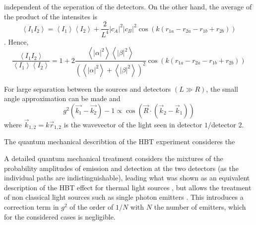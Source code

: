 independent of the seperation of the detectors. On the other hand, the average of the product of the intensites is
\begin{equation}
	\left\langle I_{1} I_{2}\right\rangle =
	\left\langle I_{1}\right\rangle\left\langle I_{2}\right\rangle+\frac{2}{L^{4}}|c_A|^{2}|c_B|^{2} \cos \left(k\left(r_{1 a}-r_{2 a}-r_{1 b}+r_{2 b}\right)\right) 
\end{equation}.
Hence,
\begin{equation}
	\frac{\left\langle I_{1} I_{2}\right\rangle}{\left\langle I_{1}\right\rangle\left\langle I_{2}\right\rangle}
	=1+2 \frac{\left\langle|\alpha|^{2}\right\rangle\left\langle|\beta|^{2}\right\rangle}{\left(\left\langle|\alpha|^{2}\right\rangle+\left\langle|\beta|^{2}\right\rangle\right)^{2}} \cos \left(k\left(r_{1 a}-r_{2 a}-r_{1 b}+r_{2 b}\right)\right)
\end{equation}

For large separation between the sources and detectors $(L \gg R)$, the small angle approximation can be made and
\begin{equation}
	g^2\left(\vec{k_1}-\vec{k_2}\right)-1\propto \cos{\left(\vec{R} \cdot\left(\vec{k}_{2}-\vec{k}_{1}\right)\right)}
\end{equation} 
where $\vec{k}_{1,2}=k \vec{r}_{1,2}$ is the wavevector of the light seen in detector $1$/detector $2$.



The quantum mechanical describtion of the HBT experiment consideres the 

A detailed quantum mechanical treatment considers the mixtures of the probability amplitudes of emission and detection at the two detectors (as the individual paths are indistinguishable), leading what was shown as an equivalent description of the HBT effect for thermal light sources \cite{fano1961,sudarshan1963,glauber2006}, but allows the treatment of non classical light sources such as single photon emitters \cite{mandel1995,classen2017}. This introduces a correction term in $g^2$ of the order of $1/N$ with $N$ the number of emitters, which for the considered cases is negligible.



